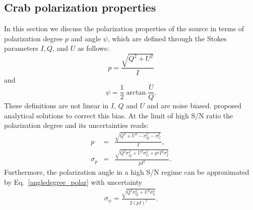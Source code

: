 \documentclass[twocolumn,traditabstract]{aa}
\begin{document}



\subsection{Crab polarization properties}\label{sec:pol_properties}
In this section we discuss the polarization properties of the source in terms of polarization degree $p$ and angle $\psi$, which are defined through the Stokes parameters $I, Q$, and $U$ as follows:
\begin{equation}
 p    = \frac{\sqrt{Q^2 + U^2}}{I} \nonumber 
\end{equation}
and
 \begin{equation}
 \psi = \frac{1}{2}\arctan\frac{U}{Q}.\label{angledegree_polar}
 \end{equation}
These definitions are not linear in $I$, $Q$ and $U$ and are noise biased. 
\citet{1980A&A....91...97S,1985A&A...142..100S,montier} proposed analytical solutions to correct this bias. At the limit of high S/N ratio the polarization degree and its uncertainties reads:
 \begin{eqnarray}
 p    &=& \frac{\sqrt{Q^2 + U^2 - \sigma_{Q}^2 - \sigma_{U}^2}}{I}, \nonumber \\ 
  \sigma_{p} &=& \frac{\sqrt{Q^2\sigma_Q^2 + U^2\sigma_U^2 + p^4I^2\sigma_I^2}}{pI^2}.
  \label{p_true_degree}
 \end{eqnarray}
 Furthermore, the polarization angle in a high S/N regime can be approximated by Eq.~\ref{angledegree_polar} with uncertainty
  \begin{eqnarray}\label{angle_uncertainty}
  \sigma_{\psi} = \frac{\sqrt{Q^2\sigma_Q^2 + U^2\sigma_u^2}}{2(pI)^2}.
  \end{eqnarray}
\end{document}
